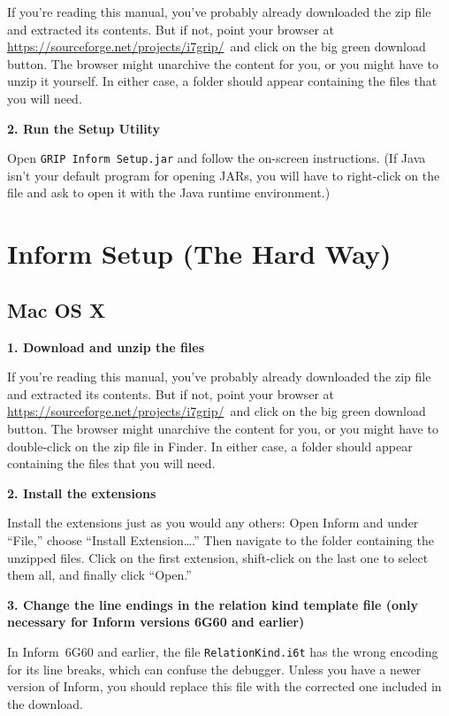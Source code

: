 \documentclass{book}
\newcommand{\lastpagebreak}{\vfill\pagebreak}
\newcommand{\downloadurl}{\url{https://sourceforge.net/projects/i7grip/}}
\newcommand{\downloadclick}{click on the big green download button}
\begin{document}
If you're reading this manual, you've probably already downloaded the zip file
and extracted its contents.  But if not, point your browser at \downloadurl\ and
\downloadclick.  The browser might unarchive the content for you, or you might
have to unzip it yourself.  In either case, a folder should appear containing
the files that you will need.

\textbf{2. Run the Setup Utility}

Open \texttt{GRIP Inform Setup.jar} and follow the on-screen instructions.  (If
Java isn't your default program for opening JARs, you will have to right-click
on the file and ask to open it with the Java runtime environment.)

\lastpagebreak

\section{Inform Setup (The Hard Way)}
\label{installing-hard}

\subsection{Mac OS X}

\textbf{1. Download and unzip the files}

If you're reading this manual, you've probably already downloaded the zip file
and extracted its contents.  But if not, point your browser at \downloadurl\ and
\downloadclick.  The browser might unarchive the content for you, or you might
have to double-click on the zip file in Finder.  In either case, a folder should
appear containing the files that you will need.

\textbf{2. Install the extensions}

Install the extensions just as you would any others: Open Inform and under
``File,'' choose ``Install Extension\dots.''  Then navigate to the folder
containing the unzipped files.  Click on the first extension, shift-click on the
last one to select them all, and finally click ``Open.''

\textbf{3. Change the line endings in the relation kind template file (only
  necessary for Inform versions 6G60 and earlier)}

In Inform~6G60 and earlier, the file \texttt{RelationKind.i6t} has the wrong
encoding for its line breaks, which can confuse the debugger.  Unless you have a
newer version of Inform, you should replace this file with the corrected one
included in the download.
\end{document}
